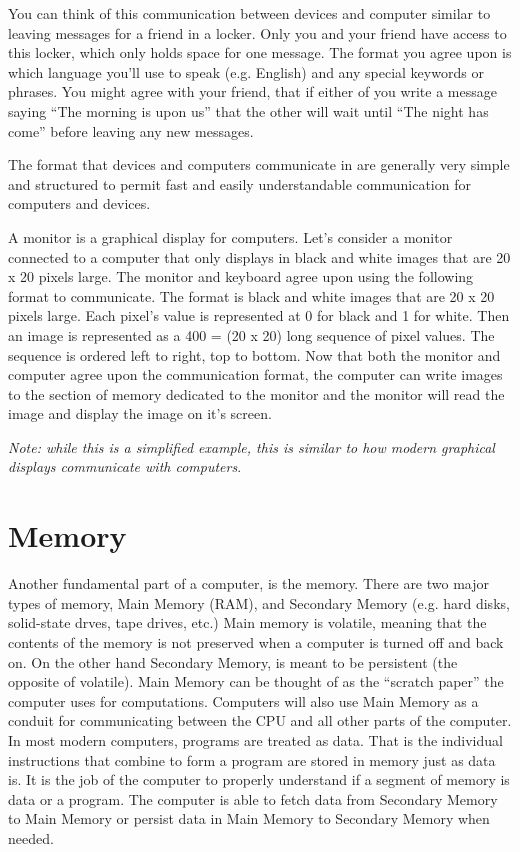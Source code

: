 \begin{example}
You can think of this communication between devices and computer similar to
leaving messages for a friend in a locker. Only you and your friend have
access to this locker, which only holds space for one message. The format
you agree upon is which language you'll use to speak (e.g. English) and any
special keywords or phrases. You might agree with your friend, that if either
of you write a message saying ``The morning is upon us'' that the other will
wait until ``The night has come'' before leaving any new messages.
\end {example}

The format that devices and computers communicate in are generally very simple
and structured to permit fast and easily understandable communication for
computers and devices.

\begin{example}
A monitor is a graphical display for computers. Let's consider a monitor
connected to a computer that only displays in black and white images
that are 20 x 20 pixels large. The monitor and keyboard agree upon using
the following format to communicate. The format is black and white images
that are 20 x 20 pixels large. Each pixel's value is represented at 0 for
black and 1 for white. Then an image is represented as a 400 = (20 x 20) long
sequence of pixel values. The sequence is ordered left to right, top to bottom.
Now that both the monitor and computer agree upon the communication format, the
computer can write images to the section of memory dedicated to the monitor
and the monitor will read the image and display the image on it's screen.

\emph{Note: while this is a simplified example, this is similar to how modern
graphical displays communicate with computers}.
\end{example}

\section{Memory}

Another fundamental part of a computer, is the memory. There are two major types
of memory, Main Memory (RAM), and Secondary Memory (e.g. hard disks, solid-state
drves, tape drives, etc.) Main memory is volatile, meaning that the contents
of the memory is not preserved when a computer is turned off and back on. On the
other hand Secondary Memory, is meant to be persistent (the opposite of volatile).
Main Memory can be thought of as the ``scratch paper'' the computer uses for
computations. Computers will also use Main Memory as a conduit for communicating
between the CPU and all other parts of the computer. In most modern computers,
programs are treated as data. That is the individual instructions that combine
to form a program are stored in memory just as data is. It is the job of the
computer to properly understand if a segment of memory is data or a program.
The computer is able to fetch data from Secondary Memory to Main Memory or
persist data in Main Memory to Secondary Memory when needed.

